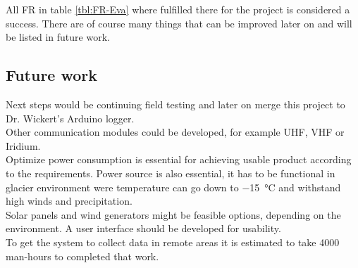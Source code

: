 All FR in table \ref{tbl:FR-Eva} where fulfilled there for the project is considered a success. There are of course many things that can be improved later on and will be listed in future work.

\subsection*{Future work}

Next steps would be continuing field testing and later on merge this project to Dr. Wickert's Arduino logger. \\
Other communication modules could be developed, for example UHF, VHF or Iridium.\\
Optimize power consumption is essential for achieving usable product according to the requirements. Power source is also essential, it has to be functional in glacier environment were temperature can go down to \SI{-15}{\celsius} and withstand high winds and precipitation. \\
Solar panels and wind generators might be feasible options, depending on the environment.  
A user interface should be developed for usability. \\
To get the system to collect data in remote areas it is estimated to take 4000 man-hours to completed that work.